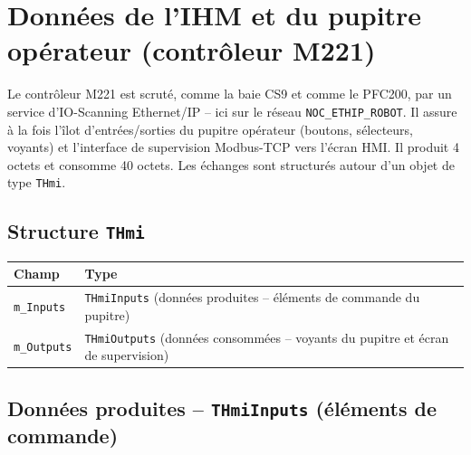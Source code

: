 \section{Données de l'IHM et du pupitre opérateur (contrôleur M221)}
\label{secDonneesIhm}

Le contrôleur M221 est scruté, comme la baie CS9 et comme le PFC200, par
un service d'IO-Scanning Ethernet/IP -- ici sur le réseau
\texttt{NOC\_ETHIP\_ROBOT}. Il assure à la fois l'îlot d'entrées/sorties du
pupitre opérateur (boutons, sélecteurs, voyants) et l'interface de
supervision Modbus-TCP vers l'écran HMI. Il produit 4 octets et consomme
40 octets. Les échanges sont structurés autour d'un objet de type
\texttt{THmi}.


\subsection{Structure \texttt{THmi}}

\begin{center}
\begin{tabular}{|l|l|}
\hline
\textbf{Champ} & \textbf{Type} \\
\hline
\texttt{m\_Inputs} & \texttt{THmiInputs} (données produites -- éléments de
commande du pupitre) \\
\hline
\texttt{m\_Outputs} & \texttt{THmiOutputs} (données consommées -- voyants
du pupitre et écran de supervision) \\
\hline
\end{tabular}
\end{center}

\subsection{Données produites -- \texttt{THmiInputs} (éléments de commande)}

